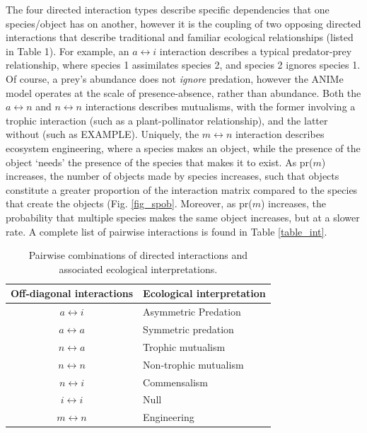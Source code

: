 \documentclass[twocolumn,preprintnumbers,amsmath,amssymb,superscriptaddress]{revtex4-1}
\begin{document}
The four directed interaction types describe specific dependencies that one species/object has on another, however it is the coupling of two opposing directed interactions that describe traditional and familiar ecological relationships (listed in Table 1).
For example, an $a \leftrightarrow i$ interaction describes a typical predator-prey relationship, where species 1 assimilates species 2, and species 2 ignores species 1.
Of course, a prey's abundance does not \emph{ignore} predation, however the ANIMe model operates at the scale of presence-absence, rather than abundance.
Both the $a \leftrightarrow n$ and $n \leftrightarrow n$ interactions describes mutualisms, with the former involving a trophic interaction (such as a plant-pollinator relationship), and the latter without (such as EXAMPLE).
Uniquely, the $m \leftrightarrow n$ interaction describes ecosystem engineering, where a species makes an object, while the presence of the object `needs' the presence of the species that makes it to exist.
As pr($m$) increases, the number of objects made by species increases, such that objects constitute a greater proportion of the interaction matrix compared to the species that create the objects (Fig. \ref{fig_spob}.
Moreover, as pr($m$) increases, the probability that multiple species makes the same object increases, but at a slower rate.
A complete list of pairwise interactions is found in Table \ref{table_int}.


\begin{table}[h]
  \begin{tabular}{ c  l }
    \hline
    Off-diagonal interactions & Ecological interpretation \\
    \hline
    $a \leftrightarrow i$ & Asymmetric Predation \\
    $a \leftrightarrow a$ & Symmetric predation \\
    $n \leftrightarrow a$ & Trophic mutualism \\
    $n \leftrightarrow n$ & Non-trophic mutualism \\
    $n \leftrightarrow i$ & Commensalism \\
    $i \leftrightarrow i$ & Null \\
    $m \leftrightarrow n$ & Engineering \\
    \hline
  \end{tabular}
  \caption{Pairwise combinations of directed interactions and associated ecological interpretations.}
\end{table}
\end{document}
